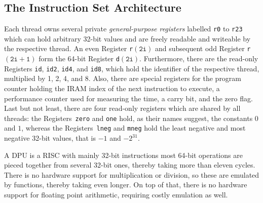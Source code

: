 \subsection{The Instruction Set Architecture}
\label{sec:prereq:arch:isa}

Each thread owns several private \emph{general-purpose registers} labelled \lstinline|r0| to \lstinline|r23| which can hold arbitrary 32-bit values and are freely readable and writeable by the respective thread.
An even Register \lstinline|r|\(\mathtt{(2i)}\) and subsequent odd Register \lstinline|r|\(\mathtt{(2i+1)}\) form the 64-bit Register \lstinline|d|\(\mathtt{(2i)}\).
Furthermore, there are the read-only Registers \lstinline|id|, \lstinline|id2|, \lstinline|id4|, and \lstinline|id8|, which hold the identifier of the respective thread, multiplied by 1, 2, 4, and 8.
Also, there are special registers for the program counter holding the \ac{IRAM} index of the next instruction to execute, a performance counter used for measuring the time, a carry bit, and the zero flag.
Last but not least, there are four read-only registers which are shared by all threads:
the Registers~\lstinline|zero| and \lstinline|one| hold, as their names suggest, the constants \(0\) and \(1\), whereas the Registers~\lstinline|lneg| and \lstinline|mneg| hold the least negative and most negative 32-bit values, that is \(-1\) and \(-2^{31}\).

A \ac{DPU} is a \ac{RISC} with mainly 32-bit instructions \Dash most 64-bit operations are pieced together from several 32-bit ones, thereby taking more than eleven cycles.
There is no hardware support for multiplication or division, so these are emulated by functions, thereby taking even longer.
On top of that, there is no hardware support for floating point arithmetic, requiring costly emulation as well.

